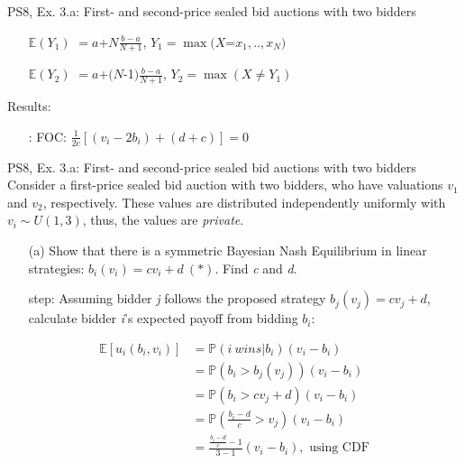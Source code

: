 \begin{frame}{PS8, Ex. 3.a: First- and second-price sealed bid auctions with two bidders}
\begin{multicols}{2}
\begin{enumerate}
        \item[$\mathbb{E}(Y_1)$] $=a$+$N\frac{b-a}{N+1}$, $Y_1=\max(X$=$x_1,..,x_N)$
        \item[$\mathbb{E}(Y_2)$] $=a$+$(N$-1$)\frac{b-a}{N+1}$, $Y_2=\max(X\neq Y_1)$
      \end{enumerate}
      \vspace{-6pt}
      Results:
      \vspace{-6pt}
      \begin{itemize}
        \item[\nth{2}:] FOC: $\frac{1}{2c}[(v_i-2b_i)+(d+c)]=0$
      \end{itemize}
      \vfill\null
    \end{multicols}
\end{frame}
\begin{frame}{PS8, Ex. 3.a: First- and second-price sealed bid auctions with two bidders}
    Consider a first-price sealed bid auction with two bidders, who have valuations $v_1$ and $v_2$, respectively. These values are distributed independently uniformly with $v_i\sim U(1,3)$, thus, the values are \textit{private}.
    \vspace{-4pt}
    \begin{itemize}
      \item[(a)] Show that there is a symmetric Bayesian Nash Equilibrium in linear strategies: $b_i(v_i) = cv_i + d\ (*)$. Find \textit{c} and \textit{d}.
    \end{itemize}
    \vspace{-8pt}
    \begin{multicols}{2}
      \begin{itemize}
        \item[\nth{1} step:] Assuming bidder \textit{j} follows the proposed strategy $b_j(v_j) = cv_j + d$, calculate bidder \textit{i}'s expected payoff from bidding $b_i$:
      \end{itemize}
      \vspace{-4pt}
      \begin{align*}
        \mathbb{E}[u_i(b_i,v_i)]&=\mathbb{P}(i\ wins|b_i)(v_i-b_i)\\
                                &=\mathbb{P}(b_i>b_j(v_j))(v_i-b_i)\\
                                &=\mathbb{P}(b_i>cv_j+d)(v_i-b_i)\\
                                &=\mathbb{P}\left(\frac{b_i-d}{c}>v_j\right)(v_i-b_i)\\
                                &=\frac{\frac{b_i-d}{c}-1}{3-1}(v_i-b_i),\text{ using CDF}\\

\end{align*}
\end{multicols}
\end{frame}
